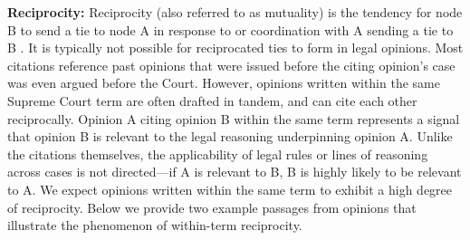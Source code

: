 \documentclass[headsepline=true, abstracton]{scrartcl}
\begin{document}
\noindent \textbf{Reciprocity:} Reciprocity (also referred to as mutuality) is the tendency for node B to send a tie to node A in response to or coordination with A sending a tie to B \citep{garlaschelli2004patterns}. It is typically not possible for reciprocated ties to form in legal opinions. Most citations reference past opinions that were issued before the citing opinion's case was even argued before the Court.  However, opinions written within the same Supreme Court term are often drafted in tandem, and can cite each other reciprocally.  Opinion A citing opinion B within the same term represents a signal that opinion B is relevant to the legal reasoning underpinning opinion A. Unlike the citations themselves, the applicability of legal rules or lines of reasoning across cases is not directed---if A is relevant to B, B is highly likely to be relevant to A. We expect opinions written within the same term to exhibit a high degree of reciprocity. Below we provide two example passages from opinions that illustrate the phenomenon of within-term reciprocity.  
\end{document}
